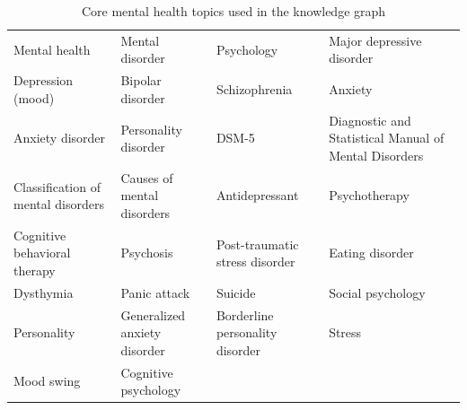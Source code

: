 \begin{table}[!h]
\centering
\caption{Core mental health topics used in the knowledge graph}\label{tab:core}
\begin{tabularx}{\textwidth}{>{\raggedright\arraybackslash}X >{\raggedright\arraybackslash}X >{\raggedright\arraybackslash}X >{\raggedright\arraybackslash}X}
\toprule
Mental health & Mental disorder & Psychology & Major depressive disorder \\
Depression (mood) & Bipolar disorder & Schizophrenia & Anxiety \\
Anxiety disorder & Personality disorder & DSM-5 & Diagnostic and Statistical Manual of Mental Disorders \\
Classification of mental disorders & Causes of mental disorders & Antidepressant & Psychotherapy \\
Cognitive behavioral therapy & Psychosis & Post-traumatic stress disorder & Eating disorder \\
Dysthymia & Panic attack & Suicide & Social psychology \\
Personality & Generalized anxiety disorder & Borderline personality disorder & Stress \\
Mood swing & Cognitive psychology & & \\
\bottomrule
\end{tabularx}
\end{table}